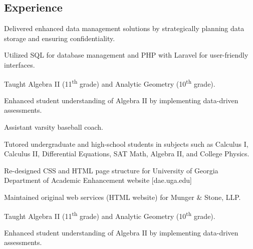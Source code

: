 \documentclass[]{plushcv}
\begin{document}
\begin{paracol}{2}

\switchcolumn[0]


\section{Experience}
\begin{tightemize}
\item Delivered enhanced data management solutions by strategically planning data storage and ensuring confidentiality.
\item Utilized SQL for database management and PHP with Laravel for user-friendly interfaces.
\end{tightemize}
\sectionsep

\begin{tightemize}
\item Taught Algebra II (11\textsuperscript{th} grade) and Analytic Geometry (10\textsuperscript{th} grade).
\item Enhanced student understanding of Algebra II by implementing data-driven assessments.
\item Assistant varsity baseball coach.
\end{tightemize}
\sectionsep

\begin{tightemize}
	\item Tutored undergraduate and high-school students in subjects such as Calculus I, Calculus II, Differential Equations, SAT Math, Algebra II, and College Physics.
	\item Re-designed CSS and HTML page structure for University of Georgia Department of Academic Enhancement website [dae.uga.edu]
	\item {Maintained original web services (HTML website) for Munger \& Stone, LLP.}
\end{tightemize}
\sectionsep

\begin{tightemize}
	\item Taught Algebra II (11\textsuperscript{th} grade) and Analytic Geometry (10\textsuperscript{th} grade).
	\item Enhanced student understanding of Algebra II by implementing data-driven assessments.
\end{tightemize}
\sectionsep


\end{paracol}
\end{document}
